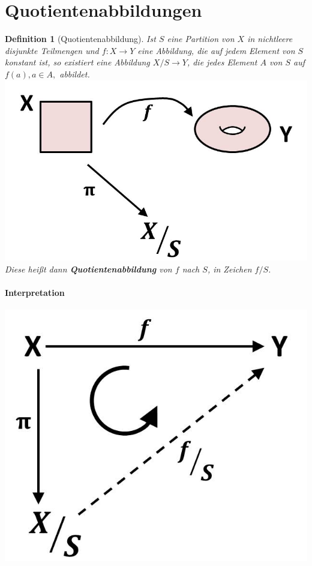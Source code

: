 \documentclass[a4paper,11pt,notitlepage]{report}
\newtheorem{definition}{Definition}[chapter]
\begin{document}
\newpage
\section{Quotientenabbildungen}

\begin{definition}[Quotientenabbildung]
Ist $S$ eine Partition von $X$ in nichtleere disjunkte Teilmengen und $f \colon X \rightarrow Y$ eine Abbildung, die auf jedem Element von $S$ konstant ist, so existiert eine Abbildung $X/S \rightarrow Y$, die jedes Element $A$ von $S$ auf $f(a), a \in A,$ abbildet. \newline
\includegraphics[scale=0.4]{images/Quotientenabbildung.jpg} \newline
Diese heißt dann \textbf{Quotientenabbildung} von $f$ nach $S$, in Zeichen $f/S$.
\end{definition}

\paragraph{Interpretation}
\begin{center}
\includegraphics[scale=0.4]{images/f_modulo_S_Diagramm.jpg}
\end{center}
\end{document}
